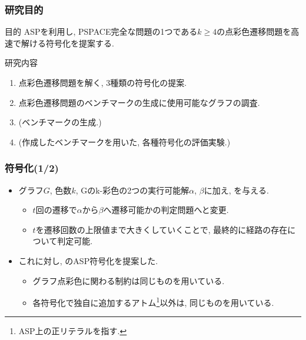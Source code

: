 \documentclass[dvipdfmx,11pt]{beamer}
\begin{document}

\begin{frame}\frametitle{研究目的}
  \begin{alertblock}{目的}
    ASPを利用し, PSPACE完全な問題の1つである$k \ge 4$の点彩色遷移問題を高速で解ける符号化を提案する.
  \end{alertblock}

  \begin{block}{研究内容}
    \begin{enumerate}
      \item 点彩色遷移問題を解く, 3種類の符号化の提案.
      \item 点彩色遷移問題のベンチマークの生成に使用可能なグラフの調査.
      \item (ベンチマークの生成.)
      \item (作成したベンチマークを用いた, 各種符号化の評価実験.)
    \end{enumerate}
  \end{block}

\end{frame}


\begin{frame}\frametitle{符号化(1/2)}

  \begin{itemize}
    \item グラフ$G$, 色数$k$, Gのk-彩色の2つの実行可能解$\alpha$, $\beta$に加え, を与える.
    \begin{itemize}
      \item $t$回の遷移で$\alpha$から$\beta$へ遷移可能かの判定問題へと変更.
      \item $t$を遷移回数の上限値まで大きくしていくことで, 最終的に経路の存在について判定可能. 
    \end{itemize}
    \item これに対し, のASP符号化を提案した. 
    \begin{itemize}
      \item グラフ点彩色に関わる制約は同じものを用いている.
      \item 各符号化で独自に追加するアトム\footnote{ASP上の正リテラルを指す.}以外は, 同じものを用いている.
    \end{itemize}
  \end{itemize}


  
\end{frame}
\end{document}
